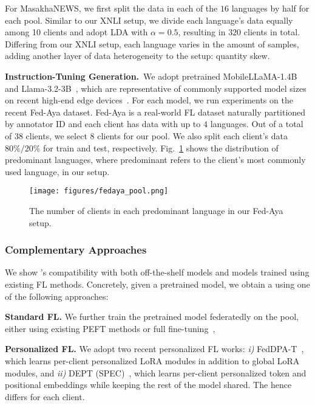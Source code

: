 For MasakhaNEWS, we first split the data in each of the $16$ languages by half for each pool. Similar to our XNLI setup, we divide each language's data equally among 10 clients and adopt LDA with $\alpha=0.5$, resulting in $320$ clients in total. Differing from our XNLI setup, each language varies in the amount of samples, adding another layer of data heterogeneity to the setup: quantity skew.

\noindent\textbf{Instruction-Tuning Generation.}~We adopt pretrained MobileLLaMA-1.4B~\cite{mobilellama} and Llama-3.2-3B~\cite{llama3}, which are representative of commonly supported model sizes on recent high-end edge devices~\cite{openelm2024icmlw,2024_mobilequant,edgellm2024tmc}. For each model, we run experiments on the recent Fed-Aya dataset. Fed-Aya is a real-world FL dataset naturally partitioned by annotator ID and each client has data with up to $4$ languages. Out of a total of $38$ clients, we select $8$ clients for our \unseen{} pool. We also split each client's data $80\%/20\%$ for train and test, respectively. Fig.~\ref{fig:fed-aya} shows the distribution of predominant languages, where predominant refers to the client's most commonly used language, in our setup.

\begin{figure}
    \small
    \centering
    \texttt{[image: figures/fedaya\_pool.png]}
    \vspace{-1.5em}
    \caption{The number of clients in each predominant language in our Fed-Aya setup.}
    \label{fig:fed-aya}
    \vspace{-2em}
\end{figure}

\subsubsection{Complementary Approaches}\label{sec:complementary}

We show \method{}'s compatibility with both off-the-shelf models and models trained using existing FL methods. Concretely, given a pretrained model, we obtain a \basemodel{} using one of the following approaches: 

\noindent\textbf{Standard FL.} We further train the pretrained model federatedly on the \seen{} pool, either using existing PEFT methods or full fine-tuning~\cite{fedllm-bench, fedpeft},  

\noindent\textbf{Personalized FL.} We adopt two recent personalized FL works: \textit{i)} FedDPA-T~\cite{FedDPA}, which learns per-client personalized LoRA modules in addition to global LoRA modules, and \textit{ii)} DEPT (SPEC)~\cite{DEPT}, which learns per-client personalized token and positional embeddings while keeping the rest of the model shared. The \basemodel{} hence differs for each client.

